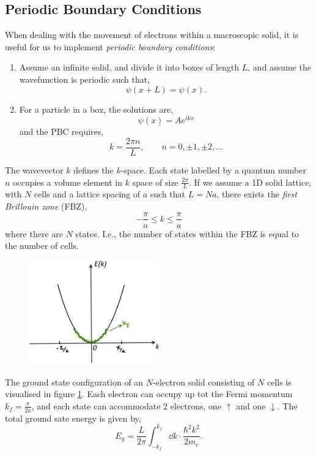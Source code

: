 \documentclass{book}
\begin{document}
\subsection{Periodic Boundary Conditions}
When dealing with the movement of electrons within a macroscopic solid, it is useful for us to implement \textit{periodic boundary conditions}:
\begin{enumerate}
	\item Assume an infinite solid, and divide it into boxes of length $L$, and assume the wavefunction is periodic such that,
	\begin{equation}
		\psi(x+L) = \psi(x).
	\end{equation}
	\item For a particle in a box, the solutions are,
	\begin{equation}
		\psi(x) = Ae^{ikx}
	\end{equation}
	and the PBC requires,
	\begin{equation}
		k = \frac{2\pi n}{L}, \hspace{2em} 	n=0,\pm1,\pm2,\ldots
	\end{equation}
\end{enumerate}
The wavevector $k$ defines the $k$-space. Each state labelled by a quantum number $n$ occupies a volume element in $k$ space of size $\frac{2\pi}{L}$. If we assume a 1D solid lattice, with $N$ cells and a lattice spacing of $a$ such that $L = Na$, there exists the \textit{first Brillouin zone} (FBZ),
\begin{equation}
	-\frac{\pi}{a} \leq k \leq \frac{\pi}{a}
\end{equation}
where there are $N$ states. I.e., the number of states within the FBZ is equal to the number of cells. 
\begin{figure}[h]
	\centering
	\includegraphics[width=0.5\textwidth]{freeeee.png}
	\caption{}
	\label{fig:freeeee}
\end{figure}
The ground state configuration of an $N$-electron solid consisting of $N$ cells is visualised in figure \ref{fig:freeeee}. Each electron can occupy up tot the Fermi momentum $k_f = \frac{\pi}{2a}$, and each state can accommodate 2 electrons, one $\uparrow$ and one $\downarrow$. The total ground sate energy is given by,
\begin{equation}
	E_g = \frac{L}{2\pi}\int_{-k_f}^{k_f} \dd{k}\cdot \frac{\hbar^2k^2}{2m_e}.
\end{equation}
\end{document}
